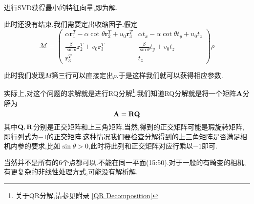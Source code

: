 进行SVD获得最小的特征向量,即为解.

此时还没有结束,我们需要定出收缩因子.假定
\begin{equation}
	\mathcal{M}=\left(\begin{array}{cc}
		\alpha \boldsymbol{r}_{1}^{T}-\alpha \cot \theta \boldsymbol{r}_{2}^{T}+u_{0} \boldsymbol{r}_{3}^{T} & \alpha t_{x}-\alpha \cot \theta t_{y}+u_{0} t_{z} \\
		\frac{\beta}{\sin \theta} \boldsymbol{r}_{2}^{T}+v_{0} \boldsymbol{r}_{3}^{T} & \frac{\beta}{\sin \theta} t_{y}+v_{0} t_{z} \\
		\boldsymbol{r}_{3}^{T} & t_{z}
	\end{array}\right) \rho
\end{equation}

	此时我们发现$M$第三行可以直接定出$\rho$.于是这样我们就可以获得相应参数.

	实际上,对这个问题的求解就是进行RQ分解\footnote{关于QR分解,请参见附录 \ref{QR Decomposition}}.我们知道RQ分解就是将一个矩阵$\bold{A}$分解为
\begin{equation}
	\bold{A} =  \bold{R} \bold{Q}
\end{equation}
其中$\bold{Q}, \bold{R}$分别是正交矩阵和上三角矩阵.当然,得到的正交矩阵可能是瑕旋转矩阵,即行列式为$-1$的正交矩阵.这种情况我们要检查分解得到的上三角矩阵是否满足相机内参的要求,比如$\sin \theta > 0$,此时将此列和正交矩阵对应行乘以$-1$即可.

当然并不是所有的6个点都可以.不能在同一平面(15:50).对于一般的有畸变的相机,有更复杂的非线性处理方式,可能没有解析解.